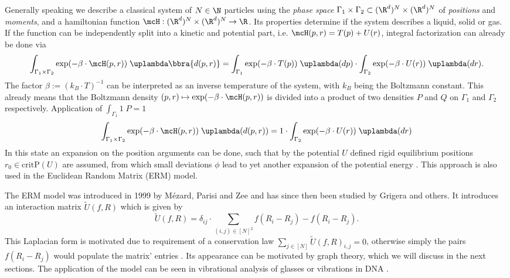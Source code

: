 Generally speaking we describe a classical system of $N\in\N$ particles using the \emph{phase space} $\Gamma_1\times\Gamma_2\subset(\R^d)^N\times(\R^d)^N$ of \emph{positions} and \emph{moments}, and a hamiltonian function $\mcH:(\R^d)^N\times(\R^d)^N\to\R$. Its properties determine if the system describes a liquid, solid or gas. If the function can be independently split into a kinetic and potential part, i.e. $\mcH(p,r) = T(p) + U(r)$, integral factorization can already be done via 
\[
    \int_{\Gamma_1\times\Gamma_2}\exp(-\beta\cdot\mcH(p,r))\;\uplambda\bbra{d(p,r)} = \int_{\Gamma_1}\exp(-\beta\cdot T(p))\;\uplambda(dp)\cdot\int_{\Gamma_2}\exp(-\beta\cdot U(r))\;\uplambda(dr).
\]
The factor $\beta:=(k_B\cdot T)^{-1}$ can be interpreted as an inverse temperature of the system, with $k_B$ being the Boltzmann constant. This already means that the Boltzmann density $(p,r)\mapsto\exp(-\beta\cdot\mcH(p,r))$ is divided into a product of two densities $P$ and $Q$ on $\Gamma_1$ and $\Gamma_2$ respectively. Application of $\int_{\Gamma_1} 1\;P = 1$ 
\[
    \int_{\Gamma_1\times\Gamma_2}\exp(-\beta\cdot\mcH(p,r))\;\uplambda(d(p,r)) = 1\cdot \int_{\Gamma_2}\exp(-\beta\cdot U(r))\;\uplambda(dr)
\] 
In this state an expansion on the position arguments can be done, such that by the potential $U$ defined rigid equilibrium positions $r_0\in\text{critP}(U)$ are assumed, from which small deviations $\phi$ lead to yet another expansion of the potential energy \cite{ALEXANDER199865}. This approach is also used in the Euclidean Random Matrix (ERM) model.

The ERM model was introduced in 1999 by Mézard, Parisi and Zee \cite{MEZARD1999689} and has since then been studied by Grigera \cite{paper:Grigera_2011} and others. It introduces an interaction matrix $\tilde U(f,R)$ which is given by 
\[
    \tilde U(f,R) = \delta_{ij}\cdot\sum_{(i,j)\in[N]^2}f(R_i - R_j) - f(R_i - R_j).
\]
This Laplacian form is motivated due to requirement of a conservation law $\sum_{j\in[N]}\tilde U(f,R)_{i,j} = 0$, otherwise simply the pairs $f(R_i - R_j)$ would populate the matrix' entries \cite{paper:Grigera_2011}. Its appearance can be motivated by graph theory, which we will discuss in the next sections. The application of the model can be seen in vibrational analysis of glasses or vibrations in DNA \cite{paper:Grigera_2011}. \\

